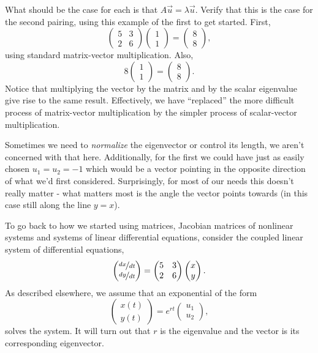 \documentclass{article}
\begin{document}
What should be the case for each is that \(A\vec{u} = \lambda \vec{u}\). Verify that this is the case for the second pairing, using this example of the first to get started. First, \[\begin{pmatrix} 5 & 3 \\ 2 & 6\end{pmatrix}\begin{pmatrix}1\\1\end{pmatrix} = \begin{pmatrix}8\\8\end{pmatrix},\] using standard matrix-vector multiplication.  Also, \[8\begin{pmatrix}1\\1\end{pmatrix} = \begin{pmatrix}8\\8\end{pmatrix}.\] Notice that multiplying the vector by the matrix and by the scalar eigenvalue give rise to the same result.  Effectively, we have ``replaced'' the more difficult process of matrix-vector multiplication by the simpler process of scalar-vector multiplication.

Sometimes we need to \emph{normalize} the eigenvector or control its length, we aren't concerned with that here.  Additionally, for the first we could have just as easily chosen \(u_1 = u_2 = -1\) which would be a vector pointing in the opposite direction of what we'd first considered.  Surprisingly, for most of our needs this doesn't really matter - what matters most is the angle the vector points towards (in this case still along the line \(y = x\)).

To go back to how we started using matrices, Jacobian matrices of nonlinear systems and systems of linear differential equations, consider  the coupled linear system of differential equations, \[\begin{pmatrix}\nicefrac{dx}{dt}\\\nicefrac{dy}{dt}\end{pmatrix} = \begin{pmatrix} 5 & 3 \\ 2 & 6\end{pmatrix}\begin{pmatrix}x\\y\end{pmatrix}.\]  As described elsewhere, we assume that an exponential of the form \[\begin{pmatrix}x(t)\\y(t)\end{pmatrix} = e^{rt}\begin{pmatrix}u_1\\u_2\end{pmatrix},\] solves the system.  It will turn out that \(r\) is the eigenvalue and the vector is its corresponding eigenvector.  
\end{document}
